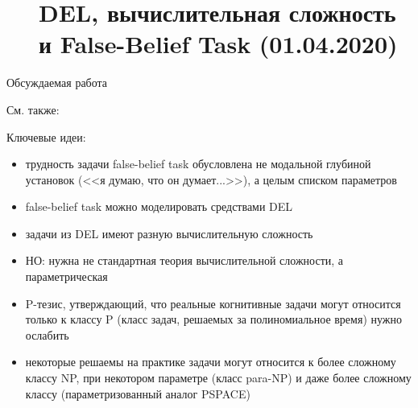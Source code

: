 

\begin{description}

\section{DEL, вычислительная сложность и False-Belief Task (01.04.2020)}
\item[Обсуждаемая работа]\autocite{VandePol2018}
\item[См. также:] \autocite{Abramov2009d,Rubio-Fernandez2013a,Szymanik2018TractabilityMind}
\end{description}


Ключевые идеи:
\begin{itemize}
\item трудность задачи false-belief task обусловлена не модальной глубиной установок (<<я думаю, что он думает...>>), а целым списком параметров 
\item  false-belief task можно моделировать средствами DEL
\item  задачи из DEL имеют разную вычислительную сложность
\item НО: нужна не стандартная теория вычислительной сложности, а параметрическая
\item P-тезис, утверждающий, что реальные когнитивные задачи могут относится только к классу P (класс задач, решаемых за полиномиальное время) нужно ослабить
\item некоторые решаемы на практике задачи могут относится к более сложному классу NP, при некотором параметре (класс para-NP) и даже более сложному классу (параметризованный аналог PSPACE)
\end{itemize}

